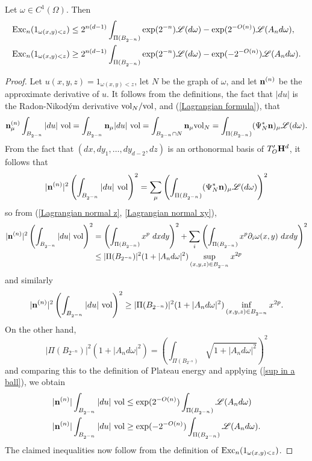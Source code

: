 \begin{lemma}\label{excess vs plateau energy}
Let $\omega \in C^1(\Omega)$. Then
\begin{align*}
    \operatorname{Exc}_n(1_{\omega(x, y) < z}) &\leq 2^{n(d - 1)} \int_{\Pi(B_{2^{-n}})} \exp(2^{-n}) \mathscr L(d\omega) - \exp(2^{-O(n)})\mathscr L(A_n d\omega),\\
    \operatorname{Exc}_n(1_{\omega(x, y) < z}) &\geq 2^{n(d - 1)} \int_{\Pi(B_{2^{-n}})} \exp(2^{-n}) \mathscr L(d\omega) - \exp(-2^{-O(n)})\mathscr L(A_n d\omega).
\end{align*}
\end{lemma}
\begin{proof}
Let $u(x, y, z) = 1_{\omega(x, y) < z}$, let $N$ be the graph of $\omega$, and let $\mathbf n^{(n)}$ be the approximate derivative of $u$.
It follows from the definitions, the fact that $|du|$ is the Radon-Nikod\'ym derivative $\mathrm{vol}_N/\mathrm{vol}$, and (\ref{Lagrangian formula}), that
$$\mathbf n^{(n)}_\mu \int_{B_{2^{-n}}} |du| ~\mathrm{vol} = \int_{B_{2^{-n}}} \mathbf n_\mu |du| ~\mathrm{vol} = \int_{B_{2^{-n}} \cap N} \mathbf n_\mu \mathrm{vol}_N = \int_{\Pi(B_{2^{-n}})} (\Psi_N^* \mathbf n)_\mu \mathscr L(d\omega).$$
From the fact that $(dx, dy_1, \dots, dy_{d - 2}, dz)$ is an orthonormal basis of $T_O' \mathbf H^d$, it follows that 
$$|\mathbf n^{(n)}|^2 \left(\int_{B_{2^{-n}}} |du| ~\mathrm{vol}\right)^2 = \sum_\mu \left(\int_{\Pi(B_{2^{-n}})} (\Psi_N^* \mathbf n)_\mu \mathscr L(d\omega)\right)^2$$
so from (\ref{Lagrangian normal z}, \ref{Lagrangian normal xy}),
\begin{align*}
    |\mathbf n^{(n)}|^2 \left(\int_{B_{2^{-n}}} |du| ~\mathrm{vol}\right)^2 &= \left(\int_{\Pi(B_{2^{-n}})} x^p ~dxdy\right)^2 + \sum_i \left(\int_{\Pi(B_{2^{-n}})} x^p \partial_i \omega(x, y) ~dxdy \right)^2 \\
    &\leq |\Pi(B_{2^{-n}})|^2 (1 + |A_nd\omega|^2) \sup_{(x, y, z) \in B_{2^{-n}}} x^{2p}
\end{align*}
and similarly
$$|\mathbf n^{(n)}|^2 \left(\int_{B_{2^{-n}}} |du| ~\mathrm{vol}\right)^2 \geq |\Pi(B_{2^{-n}})|^2 (1 + |A_nd\omega|^2) \inf_{(x, y, z) \in B_{2^{-n}}} x^{2p}.$$
On the other hand,
$$|\Pi(B_{2^{-n}})|^2 (1 + |A_nd\omega|^2) = \left(\int_{\Pi(B_{2^{-n}})} \sqrt{1 + |A_nd\omega|^2}\right)^2$$
and comparing this to the definition of Plateau energy and applying (\ref{sup in a ball}), we obtain
\begin{align*}
    |\mathbf n^{(n)}| \int_{B_{2^{-n}}} |du| ~\mathrm{vol} &\leq \exp(2^{-O(n)}) \int_{\Pi(B_{2^{-n}})} \mathscr L(A_nd\omega) \\
    |\mathbf n^{(n)}| \int_{B_{2^{-n}}} |du| ~\mathrm{vol} &\geq \exp(-2^{-O(n)}) \int_{\Pi(B_{2^{-n}})} \mathscr L(A_nd\omega).
\end{align*}
The claimed inequalities now follow from the definition of $\operatorname{Exc}_n(1_{\omega(x, y) < z})$.
\end{proof}

